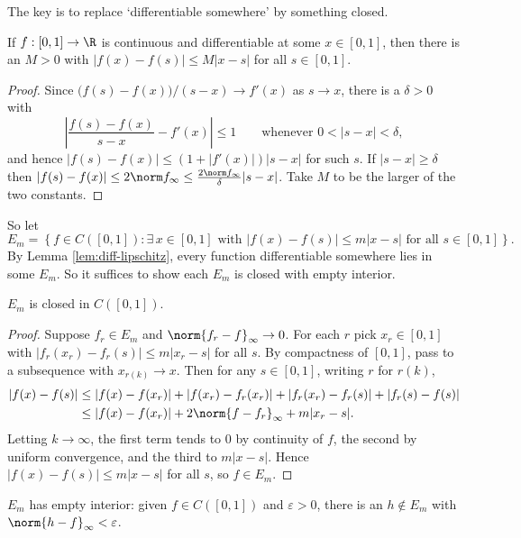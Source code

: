 The key is to replace `differentiable somewhere' by something closed.

\begin{lemma}\label{lem:diff-lipschitz}
	If $f : [0,1]\to\R$ is continuous and differentiable at some $x\in[0,1]$, then there is an $M>0$ with $|f(x)-f(s)|\leq M|x-s|$ for all $s\in[0,1]$.
\end{lemma}

\begin{proof}
	Since $\big(f(s)-f(x)\big)/(s-x)\to f'(x)$ as $s\to x$, there is a $\delta>0$ with
	$$\left|\frac{f(s)-f(x)}{s-x}-f'(x)\right|\leq1 \qquad \text{whenever } 0<|s-x|<\delta,$$
	and hence $|f(s)-f(x)|\leq(1+|f'(x)|)|s-x|$ for such $s$. If $|s-x|\geq\delta$ then $|f(s)-f(x)|\leq 2\norm f_\infty \leq \frac{2\norm f_\infty}{\delta}|s-x|$. Take $M$ to be the larger of the two constants.
\end{proof}

So let
$$E_m = \left\{f\in C([0,1]) : \exists\,x\in[0,1] \text{ with } |f(x)-f(s)|\leq m|x-s| \text{ for all } s \in[0,1]\right\}.$$
By Lemma \ref{lem:diff-lipschitz}, every function differentiable somewhere lies in some $E_m$. So it suffices to show each $E_m$ is closed with empty interior.

\begin{lemma}\label{lem:Em-closed}
	$E_m$ is closed in $C([0,1])$.
\end{lemma}

\begin{proof}
	Suppose $f_r\in E_m$ and $\norm{f_r-f}_\infty\to0$. For each $r$ pick $x_r\in[0,1]$ with $|f_r(x_r)-f_r(s)|\leq m|x_r-s|$ for all $s$. By compactness of $[0,1]$, pass to a subsequence with $x_{r(k)}\to x$. Then for any $s\in[0,1]$, writing $r$ for $r(k)$,
	\begin{align*}
		|f(x)-f(s)| &\leq |f(x)-f(x_r)| + |f(x_r)-f_r(x_r)| + |f_r(x_r)-f_r(s)| + |f_r(s)-f(s)| \\
		&\leq |f(x)-f(x_r)| + 2\norm{f-f_r}_\infty + m|x_r-s|.
	\end{align*}
	Letting $k\to\infty$, the first term tends to $0$ by continuity of $f$, the second by uniform convergence, and the third to $m|x-s|$. Hence $|f(x)-f(s)|\leq m|x-s|$ for all $s$, so $f\in E_m$.
\end{proof}

\begin{lemma}\label{lem:Em-nwd}
	$E_m$ has empty interior: given $f\in C([0,1])$ and $\varepsilon>0$, there is an $h\notin E_m$ with $\norm{h-f}_\infty<\varepsilon$.
\end{lemma}

